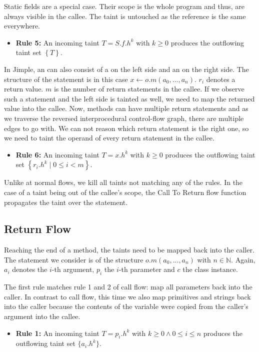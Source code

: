 \documentclass[../draft.tex]{subfiles}
\begin{document}
    Static fields are a special case. Their scope is the whole program and thus, are always visible in the callee. The taint is untouched as the reference is the same everywhere.
    \begin{itemize}
        \item[] \textbf{Rule 5:} An incoming taint $T = S.f.h^k$ with $k \geq 0$ produces the outflowing taint set $\left\{T\right\}$.
    \end{itemize}

    In Jimple, an  can also consist of a  on the left side and an  on the right side. The structure of the statement is in this case $x \leftarrow o.m(a_0,...,a_n)$. $r_i$ denotes a return value. $m$ is the number of return statements in the callee. If we observe such a statement and the left side is tainted as well, we need to map the returned value into the callee. Now, methods can have multiple return statements and as we traverse the reversed interprocedural control-flow graph, there are multiple edges to go with. We can not reason which return statement is the right one, so we need to taint the operand of every return statement in the callee.
    \begin{itemize}
        \item[] \textbf{Rule 6:} An incoming taint $T = x.h^k$ with $k \geq 0$ produces the outflowing taint set $\left\{r_i.h^k \mid 0 \leq i < m \right\}$. 
    \end{itemize}

    Unlike at normal flows, we kill all taints not matching any of the rules. In the case of a taint being out of the callee's scope, the Call To Return flow function propagates the taint over the statement.

    \subsection{Return Flow}
    Reaching the end of a method, the taints need to be mapped back into the caller. The statement we consider is of the structure $o.m(a_0, ..., a_n)$ with $n \in \mathbb{N}$. Again, $a_i$ denotes the $i$-th argument, $p_i$ the $i$-th parameter and $c$ the class instance.

    The first rule matches rule 1 and 2 of call flow: map all parameters back into the caller. In contrast to call flow, this time we also map primitives and strings back into the caller because the contents of the variable were copied from the caller's argument into the callee.
    \begin{itemize}
        \item[] \textbf{Rule 1:} An incoming taint $T = p_i.h^k$ with $k \geq 0 \land 0 \leq i \leq n$ produces the outflowing taint set $\{a_i.h^k\}$.
    \end{itemize}
\end{document}
